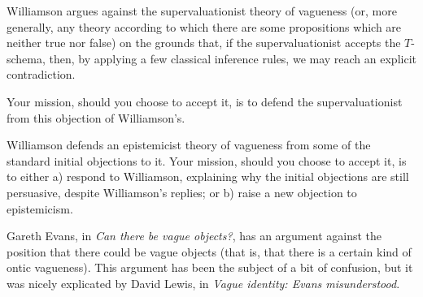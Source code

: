 \documentclass[10pt]{article}
\newcommand{\p}{\item}
\newcommand{\e}{\emph}
\begin{document}
	\p Williamson argues against the supervaluationist theory of vagueness (or, more generally, any theory according to which there are some propositions which are neither true nor false) on the grounds that, if the supervaluationist accepts the $T$-schema, then, by applying a few classical inference rules, we may reach an explicit contradiction.  
	
	Your mission, should you choose to accept it, is to defend the supervaluationist from this objection of Williamson's.
	\p Williamson defends an epistemicist theory of vagueness from some of the standard initial objections to it.  Your mission, should you choose to accept it, is to either a) respond to Williamson, explaining why the initial objections are still persuasive, despite Williamson's replies; or b) raise a new objection to epistemicism.  
	\p Gareth Evans, in \e{Can there be vague objects?}, has an argument against the position that there could be vague objects (that is, that there is a certain kind of ontic vagueness).  This argument has been the subject of a bit of confusion, but it was nicely explicated by David Lewis, in \e{Vague identity: Evans misunderstood}.  
	
\end{document}
